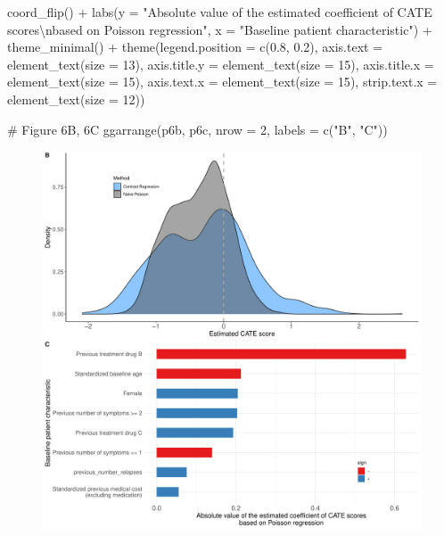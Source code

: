 \documentclass[
  letterpaper,
  DIV=11,
  numbers=noendperiod]{scrreprt}
\newenvironment{Shaded}{\begin{snugshade}}{\end{snugshade}}
\newcommand{\AttributeTok}[1]{\textcolor[rgb]{0.40,0.45,0.13}{#1}}
\newcommand{\CommentTok}[1]{\textcolor[rgb]{0.37,0.37,0.37}{#1}}
\newcommand{\DecValTok}[1]{\textcolor[rgb]{0.68,0.00,0.00}{#1}}
\newcommand{\FloatTok}[1]{\textcolor[rgb]{0.68,0.00,0.00}{#1}}
\newcommand{\FunctionTok}[1]{\textcolor[rgb]{0.28,0.35,0.67}{#1}}
\newcommand{\NormalTok}[1]{\textcolor[rgb]{0.00,0.23,0.31}{#1}}
\newcommand{\SpecialCharTok}[1]{\textcolor[rgb]{0.37,0.37,0.37}{#1}}
\newcommand{\StringTok}[1]{\textcolor[rgb]{0.13,0.47,0.30}{#1}}
\begin{document}
\begin{Shaded}
\begin{Highlighting}[]
  \FunctionTok{coord\_flip}\NormalTok{() }\SpecialCharTok{+}
  \FunctionTok{labs}\NormalTok{(}\AttributeTok{y =} \StringTok{"Absolute value of the estimated coefficient of CATE scores}\SpecialCharTok{\textbackslash{}n}\StringTok{based on Poisson regression"}\NormalTok{, }\AttributeTok{x =} \StringTok{"Baseline patient characteristic"}\NormalTok{) }\SpecialCharTok{+}
  \FunctionTok{theme\_minimal}\NormalTok{() }\SpecialCharTok{+}
  \FunctionTok{theme}\NormalTok{(}\AttributeTok{legend.position =} \FunctionTok{c}\NormalTok{(}\FloatTok{0.8}\NormalTok{, }\FloatTok{0.2}\NormalTok{),}
        \AttributeTok{axis.text =} \FunctionTok{element\_text}\NormalTok{(}\AttributeTok{size =} \DecValTok{13}\NormalTok{),}
        \AttributeTok{axis.title.y =} \FunctionTok{element\_text}\NormalTok{(}\AttributeTok{size =} \DecValTok{15}\NormalTok{),}
        \AttributeTok{axis.title.x =} \FunctionTok{element\_text}\NormalTok{(}\AttributeTok{size =} \DecValTok{15}\NormalTok{),}
        \AttributeTok{axis.text.x =} \FunctionTok{element\_text}\NormalTok{(}\AttributeTok{size =} \DecValTok{15}\NormalTok{),}
        \AttributeTok{strip.text.x =} \FunctionTok{element\_text}\NormalTok{(}\AttributeTok{size =} \DecValTok{12}\NormalTok{))}

\CommentTok{\# Figure 6B, 6C}
\FunctionTok{ggarrange}\NormalTok{(p6b, p6c, }\AttributeTok{nrow =} \DecValTok{2}\NormalTok{, }\AttributeTok{labels =} \FunctionTok{c}\NormalTok{(}\StringTok{"B"}\NormalTok{, }\StringTok{"C"}\NormalTok{))}
\end{Highlighting}
\end{Shaded}

\begin{figure}[H]

{\centering \includegraphics{chapter_18_files/figure-pdf/coefs-1.pdf}

}

\end{figure}
\end{document}
